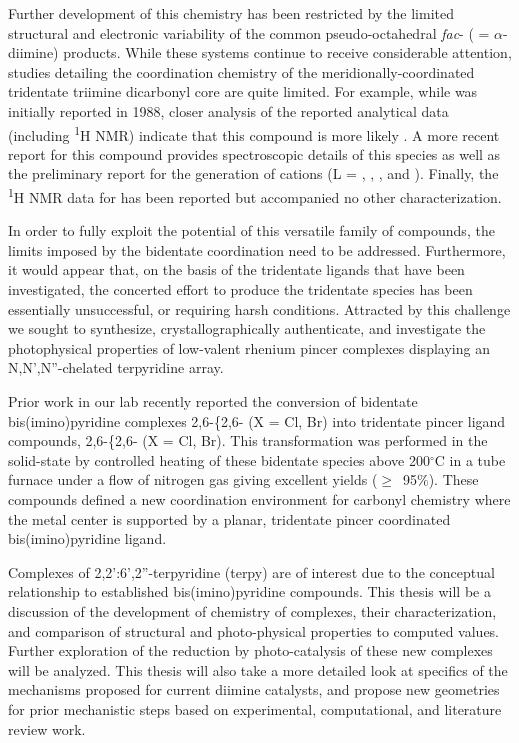 Further development of this chemistry has been restricted by the limited structural and electronic variability of the common pseudo-octahedral \textit{fac}-\ce{[L2ReX(CO)3]} ( = $\alpha$-diimine) products. While these systems continue to receive considerable attention, studies detailing the coordination chemistry of the meridionally-coordinated tridentate triimine  dicarbonyl core are quite limited\autocite{jurca2013}. For example, while  was initially reported in 1988\autocite{juris1988}, closer analysis of the reported analytical data (including \textsuperscript{1}H NMR) indicate that this compound is more likely . A more recent report for this compound provides spectroscopic details of this species as well as the preliminary report for the generation of  cations (L = , , , and )\autocite{black2012}. Finally, the \textsuperscript{1}H NMR data for  has been reported\autocite{abel1993} but accompanied no other characterization.

In order to fully exploit the potential of this versatile family of compounds, the limits imposed by the bidentate coordination need to be addressed. Furthermore, it would appear that, on the basis of the tridentate ligands that have been investigated, the concerted effort to produce the tridentate species has been essentially unsuccessful, or requiring harsh conditions\autocite{potgieter2013}. Attracted by this challenge we sought to synthesize, crystallographically authenticate, and investigate the photophysical properties of low-valent rhenium pincer complexes displaying an N,N',N''-chelated terpyridine array. 

Prior work in our lab recently reported the conversion of bidentate bis(imino)pyridine complexes 2,6-\{2,6-  (X = Cl, Br) into tridentate pincer ligand compounds, 2,6-\{2,6- (X = Cl, Br)\autocite{jurca2013}. This transformation was performed in the solid-state by controlled heating of these bidentate species above 200$^\circ$C in a tube furnace under a flow of nitrogen gas giving excellent yields ($\geq$~95\%). These compounds defined a new coordination environment for  carbonyl chemistry where the metal center is supported by a planar, tridentate pincer coordinated bis(imino)pyridine ligand. 

Complexes of 2,2':6',2''-terpyridine (terpy) are of interest due to the conceptual relationship to established bis(imino)pyridine compounds\autocite{russell2010, tondreau2012}. This thesis will be a discussion of the development of chemistry of  complexes, their characterization, and comparison of structural and photo-physical properties to computed values. Further exploration of the  reduction by photo-catalysis of these new complexes will be analyzed. This thesis will also take a more detailed look at specifics of the mechanisms proposed for current  diimine catalysts, and propose new geometries for prior mechanistic steps based on experimental, computational, and literature review work.

